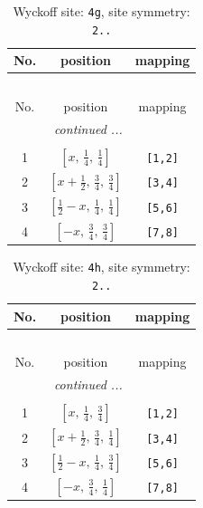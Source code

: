 \documentclass[fleqn,8pt]{jsarticle}
\begin{document}
\renewcommand{\arraystretch}{1.2}
\begin{longtable}{ccc}
\caption{Wyckoff site: {\tt 4g}, site symmetry: {\tt 2..}}
 \\
 \hline \hline
No. & position & mapping \\ \hline \endfirsthead

\multicolumn{2}{l}{\tablename\ \thetable{}} \\
 \hline \hline
No. & position & mapping \\ \hline \endhead

 \hline \hline
\multicolumn{2}{r}{\footnotesize\it continued ...} \\ \endfoot

 \hline \hline
\multicolumn{2}{r}{} \\ \endlastfoot

1 & $\left[ x,\, \frac{1}{4},\, \frac{1}{4} \right]$ & {\tt [1,2]} \\ \hline
2 & $\left[ x + \frac{1}{2},\, \frac{3}{4},\, \frac{3}{4} \right]$ & {\tt [3,4]} \\ \hline
3 & $\left[ \frac{1}{2} - x,\, \frac{1}{4},\, \frac{1}{4} \right]$ & {\tt [5,6]} \\ \hline
4 & $\left[ - x,\, \frac{3}{4},\, \frac{3}{4} \right]$ & {\tt [7,8]} \\
\end{longtable}
\renewcommand{\arraystretch}{1.2}
\begin{longtable}{ccc}
\caption{Wyckoff site: {\tt 4h}, site symmetry: {\tt 2..}}
 \\
 \hline \hline
No. & position & mapping \\ \hline \endfirsthead

\multicolumn{2}{l}{\tablename\ \thetable{}} \\
 \hline \hline
No. & position & mapping \\ \hline \endhead

 \hline \hline
\multicolumn{2}{r}{\footnotesize\it continued ...} \\ \endfoot

 \hline \hline
\multicolumn{2}{r}{} \\ \endlastfoot

1 & $\left[ x,\, \frac{1}{4},\, \frac{3}{4} \right]$ & {\tt [1,2]} \\ \hline
2 & $\left[ x + \frac{1}{2},\, \frac{3}{4},\, \frac{1}{4} \right]$ & {\tt [3,4]} \\ \hline
3 & $\left[ \frac{1}{2} - x,\, \frac{1}{4},\, \frac{3}{4} \right]$ & {\tt [5,6]} \\ \hline
4 & $\left[ - x,\, \frac{3}{4},\, \frac{1}{4} \right]$ & {\tt [7,8]} \\
\end{longtable}
\end{document}
